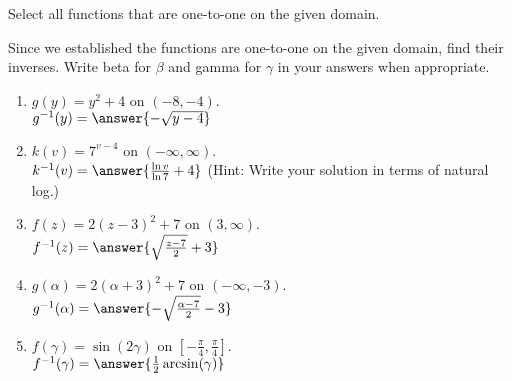 \documentclass{ximera}
\author{Elizabeth Campolongo}
\begin{document}
\begin{exercise}
Select all functions that are one-to-one on the given domain.
%
\begin{selectAll}
\end{selectAll}

\begin{exercise}
Since we established the functions are one-to-one on the given domain, find their inverses. Write beta for $\beta$ and gamma for $\gamma$ in your answers when appropriate. 
\begin{enumerate}

\item $g(y) = y^2+4$ on $(-8,-4)$.\\
$g^{-1}(y) = \answer{-\sqrt{y-4}}$

\item $k(v) = 7^{v-4}$ on $(-\infty, \infty)$.\\
$k^{-1}(v) = \answer{\frac{\ln v}{\ln7} +4}$ (Hint: Write your solution in terms of natural log.)

\item $f(z) = 2(z-3)^2+7$ on $(3, \infty)$.\\
$f^{-1}(z) = \answer{\sqrt{\frac{z-7}{2}}+3}$

\item $g(\alpha) = 2(\alpha+3)^2+7$ on $(-\infty, -3)$.\\
$g^{-1}(\alpha) = \answer{-\sqrt{\frac{\alpha-7}{2}}-3}$

\item $f(\gamma) = \sin(2\gamma)$ on $\left[-\frac{\pi}{4}, \frac{\pi}{4} \right]$. \\
$f^{-1}(\gamma) = \answer{\frac{1}{2}\arcsin(\gamma)}$


\end{enumerate}
\end{exercise}
\end{exercise}
\end{document}
